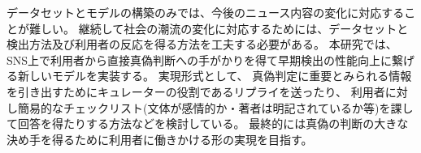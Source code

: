 
\vspace{20pt}
データセットとモデルの構築のみでは、今後のニュース内容の変化に対応することが難しい。
継続して社会の潮流の変化に対応するためには、データセットと検出方法及び利用者の反応を得る方法を工夫する必要がある。
本研究では、SNS上で利用者から直接真偽判断への手がかりを得て早期検出の性能向上に繋げる新しいモデルを実装する。
実現形式として、
真偽判定に重要とみられる情報を引き出すためにキュレーターの役割であるリプライを送ったり、
利用者に対し簡易的なチェックリスト(文体が感情的か・著者は明記されているか等)を課して回答を得たりする方法などを検討している。
最終的には真偽の判断の大きな決め手を得るために利用者に働きかける形の実現を目指す。

